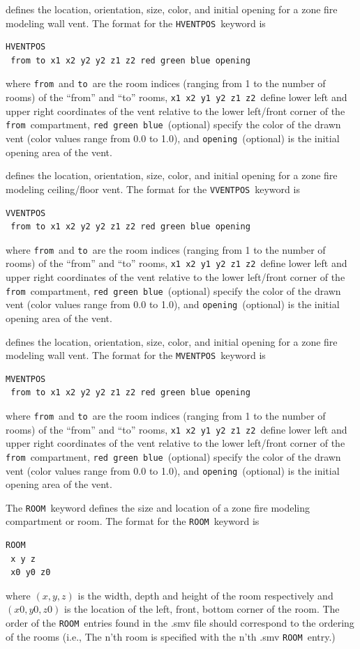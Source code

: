 \documentclass[11pt,twoside]{book}
\newcommand{\hitem}[1]{\item[{\bf #1} \hfill]}
\begin{document}
\hitem{HVENTPOS} defines the location, orientation, size, color, and initial opening for a zone fire modeling wall vent.
The format for the {\tt HVENTPOS}\ keyword is
\begin{lstlisting}
HVENTPOS
 from to x1 x2 y2 y2 z1 z2 red green blue opening
\end{lstlisting}
where {\tt from}\ and {\tt to}\  are the room indices
(ranging from 1 to the number of rooms) of the ``from'' and ``to'' rooms, {\tt x1 x2 y1 y2 z1 z2}\ define lower left and upper right
coordinates of the vent relative to the lower left/front corner of the {\tt from}\ compartment, {\tt red green blue}\ (optional) specify the
color of the drawn vent (color values range from 0.0 to 1.0), and {\tt opening}\ (optional) is the initial opening area of the vent.

\hitem{VVENTPOS} defines the location, orientation, size, color, and initial opening for a zone fire modeling ceiling/floor vent.
The format for the {\tt VVENTPOS}\ keyword is
\begin{lstlisting}
VVENTPOS
 from to x1 x2 y2 y2 z1 z2 red green blue opening
\end{lstlisting}
where {\tt from}\ and {\tt to}\  are the room indices
(ranging from 1 to the number of rooms) of the ``from'' and ``to'' rooms, {\tt x1 x2 y1 y2 z1 z2}\ define lower left and upper right
coordinates of the vent relative to the lower left/front corner of the {\tt from}\ compartment, {\tt red green blue}\ (optional) specify the
color of the drawn vent (color values range from 0.0 to 1.0), and {\tt opening}\ (optional) is the initial opening area of the vent.

\hitem{MVENTPOS} defines the location, orientation, size, color, and initial opening for a zone fire modeling wall vent.
The format for the {\tt MVENTPOS}\ keyword is
\begin{lstlisting}
MVENTPOS
 from to x1 x2 y2 y2 z1 z2 red green blue opening
\end{lstlisting}
where {\tt from}\ and {\tt to}\  are the room indices
(ranging from 1 to the number of rooms) of the ``from'' and ``to'' rooms, {\tt x1 x2 y1 y2 z1 z2}\ define lower left and upper right
coordinates of the vent relative to the lower left/front corner of the {\tt from}\ compartment, {\tt red green blue}\ (optional) specify the
color of the drawn vent (color values range from 0.0 to 1.0), and {\tt opening}\ (optional) is the initial opening area of the vent.

\hitem{ROOM}The {\tt ROOM}\ keyword defines the size and
location of a zone fire modeling compartment or room.
The format for the {\tt ROOM}\ keyword is
\begin{lstlisting}
ROOM
 x y z
 x0 y0 z0
\end{lstlisting}\hitem{ROOM}
where $(x,y,z)$ is the width, depth and height of the room
respectively and $(x0,y0,z0)$ is the location of the
left, front, bottom corner of the room.
The order of the {\tt ROOM}\ entries found in the .smv file should correspond
to the ordering of the rooms (i.e., The n'th room is specified
with the n'th .smv {\tt ROOM}\ entry.)
\end{document}
